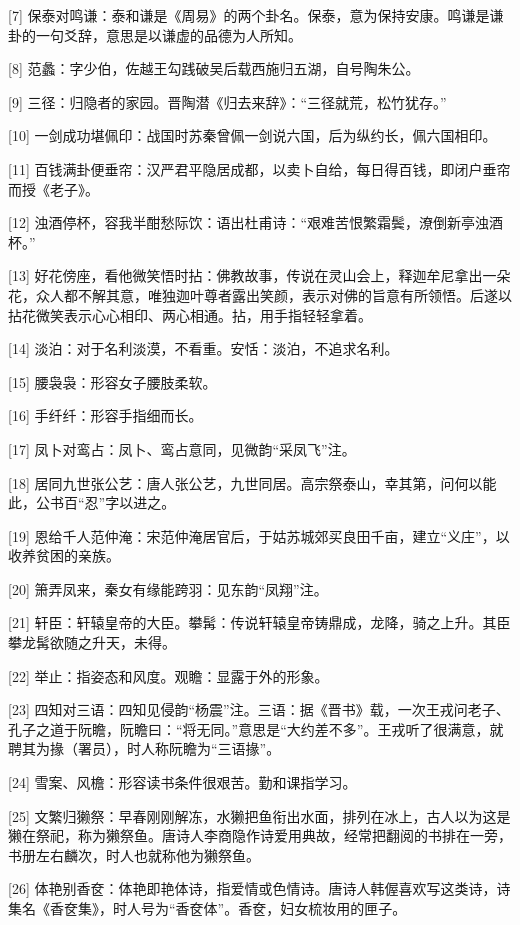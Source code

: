 \documentclass[12pt,UTF8]{ctexbook}
\begin{document}
[7] 保泰对鸣谦：泰和谦是《周易》的两个卦名。保泰，意为保持安康。鸣谦是谦卦的一句爻辞，意思是以谦虚的品德为人所知。

[8] 范蠡：字少伯，佐越王勾践破吴后载西施归五湖，自号陶朱公。

[9] 三径：归隐者的家园。晋陶潜《归去来辞》：“三径就荒，松竹犹存。”

[10] 一剑成功堪佩印：战国时苏秦曾佩一剑说六国，后为纵约长，佩六国相印。

[11] 百钱满卦便垂帘：汉严君平隐居成都，以卖卜自给，每日得百钱，即闭户垂帘而授《老子》。

[12] 浊酒停杯，容我半酣愁际饮：语出杜甫诗：“艰难苦恨繁霜鬓，潦倒新亭浊酒杯。”

[13] 好花傍座，看他微笑悟时拈：佛教故事，传说在灵山会上，释迦牟尼拿出一朵花，众人都不解其意，唯独迦叶尊者露出笑颜，表示对佛的旨意有所领悟。后遂以拈花微笑表示心心相印、两心相通。拈，用手指轻轻拿着。

[14] 淡泊：对于名利淡漠，不看重。安恬：淡泊，不追求名利。

[15] 腰袅袅：形容女子腰肢柔软。

[16] 手纤纤：形容手指细而长。

[17] 凤卜对鸾占：凤卜、鸾占意同，见微韵“采凤飞”注。

[18] 居同九世张公艺：唐人张公艺，九世同居。高宗祭泰山，幸其第，问何以能此，公书百“忍”字以进之。

[19] 恩给千人范仲淹：宋范仲淹居官后，于姑苏城郊买良田千亩，建立“义庄”，以收养贫困的亲族。

[20] 箫弄凤来，秦女有缘能跨羽：见东韵“凤翔”注。

[21] 轩臣：轩辕皇帝的大臣。攀髯：传说轩辕皇帝铸鼎成，龙降，骑之上升。其臣攀龙髯欲随之升天，未得。

[22] 举止：指姿态和风度。观瞻：显露于外的形象。

[23] 四知对三语：四知见侵韵“杨震”注。三语：据《晋书》载，一次王戎问老子、孔子之道于阮瞻，阮瞻曰：“将无同。”意思是“大约差不多”。王戎听了很满意，就聘其为掾（署员），时人称阮瞻为“三语掾”。

[24] 雪案、风檐：形容读书条件很艰苦。勤和课指学习。

[25] 文繁归獭祭：早春刚刚解冻，水獭把鱼衔出水面，排列在冰上，古人以为这是獭在祭祀，称为獭祭鱼。唐诗人李商隐作诗爱用典故，经常把翻阅的书排在一旁，书册左右麟次，时人也就称他为獭祭鱼。

[26] 体艳别香奁：体艳即艳体诗，指爱情或色情诗。唐诗人韩偓喜欢写这类诗，诗集名《香奁集》，时人号为“香奁体”。香奁，妇女梳妆用的匣子。
\end{document}
